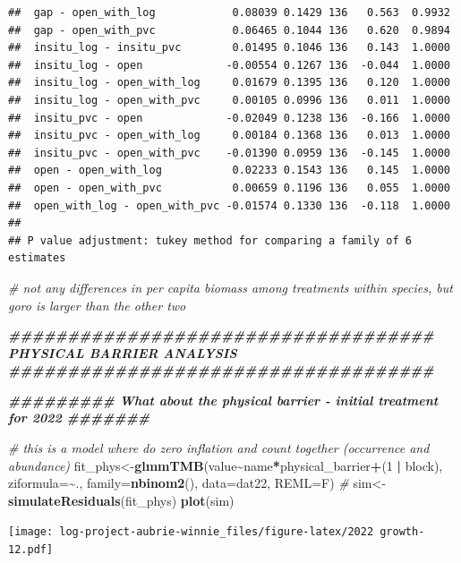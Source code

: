 \documentclass[
]{article}
\newenvironment{Shaded}{\begin{snugshade}}{\end{snugshade}}
\newcommand{\AttributeTok}[1]{\textcolor[rgb]{0.13,0.29,0.53}{#1}}
\newcommand{\CommentTok}[1]{\textcolor[rgb]{0.56,0.35,0.01}{\textit{#1}}}
\newcommand{\DecValTok}[1]{\textcolor[rgb]{0.00,0.00,0.81}{#1}}
\newcommand{\DocumentationTok}[1]{\textcolor[rgb]{0.56,0.35,0.01}{\textbf{\textit{#1}}}}
\newcommand{\FunctionTok}[1]{\textcolor[rgb]{0.13,0.29,0.53}{\textbf{#1}}}
\newcommand{\NormalTok}[1]{#1}
\newcommand{\OtherTok}[1]{\textcolor[rgb]{0.56,0.35,0.01}{#1}}
\newcommand{\SpecialCharTok}[1]{\textcolor[rgb]{0.81,0.36,0.00}{\textbf{#1}}}
\begin{document}
\begin{verbatim}
##  gap - open_with_log            0.08039 0.1429 136   0.563  0.9932
##  gap - open_with_pvc            0.06465 0.1044 136   0.620  0.9894
##  insitu_log - insitu_pvc        0.01495 0.1046 136   0.143  1.0000
##  insitu_log - open             -0.00554 0.1267 136  -0.044  1.0000
##  insitu_log - open_with_log     0.01679 0.1395 136   0.120  1.0000
##  insitu_log - open_with_pvc     0.00105 0.0996 136   0.011  1.0000
##  insitu_pvc - open             -0.02049 0.1238 136  -0.166  1.0000
##  insitu_pvc - open_with_log     0.00184 0.1368 136   0.013  1.0000
##  insitu_pvc - open_with_pvc    -0.01390 0.0959 136  -0.145  1.0000
##  open - open_with_log           0.02233 0.1543 136   0.145  1.0000
##  open - open_with_pvc           0.00659 0.1196 136   0.055  1.0000
##  open_with_log - open_with_pvc -0.01574 0.1330 136  -0.118  1.0000
## 
## P value adjustment: tukey method for comparing a family of 6 estimates
\end{verbatim}

\begin{Shaded}
\begin{Highlighting}[]
\CommentTok{\# not any differences in per capita biomass among treatments within species, but goro is larger than the other two}

\DocumentationTok{\#\#\#\#\#\#\#\#\#\#\#\#\#\#\#\#\#\#\#\#\#\#\#\#\#\#\#\#\#\#\#\#\#\#\#\# PHYSICAL BARRIER ANALYSIS \#\#\#\#\#\#\#\#\#\#\#\#\#\#\#\#\#\#\#\#\#\#\#\#\#\#\#\#\#\#\#\#\#\#\#\#}

\DocumentationTok{\#\#\#\#\#\#\#\#\# What about the physical barrier {-} initial treatment for 2022 \#\#\#\#\#\#\#}

\CommentTok{\# this is a model where do zero inflation and count together (occurrence and abundance)}
\NormalTok{fit\_phys}\OtherTok{\textless{}{-}}\FunctionTok{glmmTMB}\NormalTok{(value}\SpecialCharTok{\textasciitilde{}}\NormalTok{name}\SpecialCharTok{*}\NormalTok{physical\_barrier}\SpecialCharTok{+}\NormalTok{(}\DecValTok{1} \SpecialCharTok{|}\NormalTok{ block), }\AttributeTok{ziformula=}\SpecialCharTok{\textasciitilde{}}\NormalTok{., }\AttributeTok{family=}\FunctionTok{nbinom2}\NormalTok{(), }\AttributeTok{data=}\NormalTok{dat22, }\AttributeTok{REML=}\NormalTok{F) }\CommentTok{\#}
\NormalTok{sim}\OtherTok{\textless{}{-}}\FunctionTok{simulateResiduals}\NormalTok{(fit\_phys)}
\FunctionTok{plot}\NormalTok{(sim)}
\end{Highlighting}
\end{Shaded}

\texttt{[image: log-project-aubrie-winnie\_files/figure-latex/2022 growth-12.pdf]}
\end{document}
